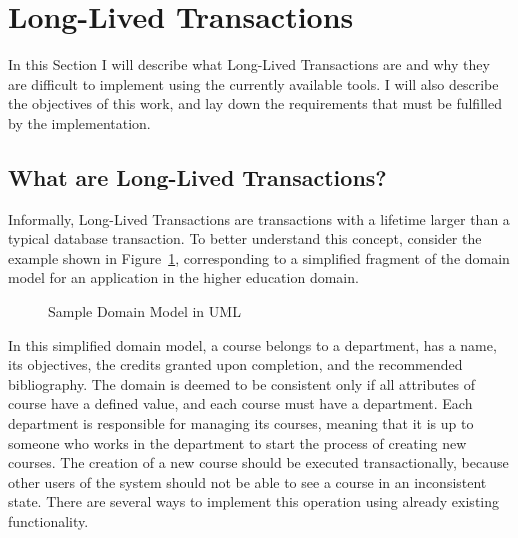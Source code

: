 \documentclass{llncs}
\begin{document}

\section{Long-Lived Transactions}

In this Section I will describe what Long-Lived Transactions are and
why they are difficult to implement using the currently available
tools. I will also describe the objectives of this work, and lay down
the requirements that must be fulfilled by the implementation.

\subsection{What are Long-Lived Transactions?}
\label{sec:what}

Informally, Long-Lived Transactions are transactions with a lifetime
larger than a typical database transaction. To better understand this
concept, consider the example shown in Figure~\ref{fig:courseDomain},
corresponding to a simplified fragment of the domain model for an
application in the higher education domain.

\begin{figure}
  \centering

\caption{Sample Domain Model in UML}
\label{fig:courseDomain}

\end{figure}

In this simplified domain model, a course belongs to a department, has
a name, its objectives, the credits granted upon completion, and the
recommended bibliography. The domain is deemed to be consistent only
if all attributes of course have a defined value, and each course must
have a department. Each department is responsible for managing its
courses, meaning that it is up to someone who works in the department
to start the process of creating new courses. The creation of a new
course should be executed transactionally, because other users of the
system should not be able to see a course in an inconsistent
state. There are several ways to implement this operation using
already existing functionality.
\end{document}
